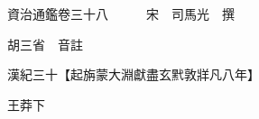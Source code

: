 










 


 
 


 

  
  
  
  
  





  
  
  
  
  
 
  

  

  
  
  



  

 
 

  
   




  

  
  


  　　資治通鑑卷三十八　　　宋　司馬光　撰

　　胡三省　音註

　　漢紀三十【起旃蒙大淵獻盡玄黓敦牂凡八年】

　　王莽下


